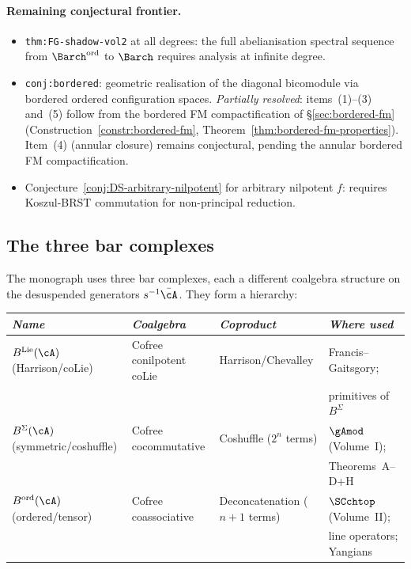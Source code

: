 \paragraph{Remaining conjectural frontier.}
\begin{itemize}
\item \texttt{thm:FG-shadow-vol2} at all degrees: the full
 abelianisation spectral sequence from
 ${\Barch}^{\mathrm{ord}}$ to $\Barch$ requires analysis at
 infinite degree.
\item \texttt{conj:bordered}: geometric realisation of the
 diagonal bicomodule via bordered ordered configuration
 spaces. \emph{Partially resolved}: items~(1)--(3) and~(5) follow
 from the bordered FM compactification of
 \S\ref{sec:bordered-fm}
 (Construction~\ref{constr:bordered-fm},
 Theorem~\ref{thm:bordered-fm-properties}). Item~(4) (annular
 closure) remains conjectural, pending the annular bordered FM
 compactification.
\item Conjecture~\ref{conj:DS-arbitrary-nilpotent} for arbitrary
 nilpotent $f$: requires
 Koszul-BRST commutation for non-principal reduction.
\end{itemize}


\subsection{The three bar complexes}
\label{subsec:concordance-three-bar-complexes}

The monograph uses three bar complexes, each a different
coalgebra structure on the desuspended generators $s^{-1}\bar\cA$.
They form a hierarchy:

\begin{center}
\renewcommand{\arraystretch}{1.25}
\begin{tabular}{llll}
\toprule
\emph{Name} & \emph{Coalgebra} & \emph{Coproduct}
 & \emph{Where used} \\
\midrule
$B^{\mathrm{Lie}}(\cA)$ \textup{(Harrison/coLie)}
 & Cofree conilpotent coLie
 & Harrison/Chevalley
 & Francis--Gaitsgory; \\
 & & & primitives of $B^\Sigma$ \\[3pt]
$B^{\Sigma}(\cA)$ \textup{(symmetric/coshuffle)}
 & Cofree cocommutative
 & Coshuffle ($2^n$ terms)
 & $\gAmod$ \textup{(}Volume~I\textup{)}; \\
 & & & Theorems~A--D+H \\[3pt]
$B^{\mathrm{ord}}(\cA)$ \textup{(ordered/tensor)}
 & Cofree coassociative
 & Deconcatenation ($n{+}1$ terms)
 & $\SCchtop$ \textup{(}Volume~II\textup{)}; \\
 & & & line operators; Yangians \\
\bottomrule
\end{tabular}
\end{center}

